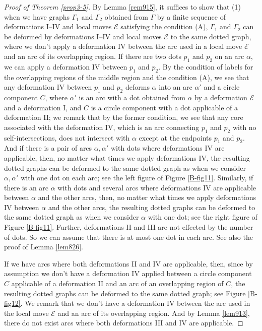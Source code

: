 \documentclass[a4paper,11pt]{amsart}
\numberwithin{equation}{section}
\begin{document}
 
\begin{proof}[
Proof of Theorem \ref{prop3-5}]
By Lemma \ref{rem915}, 
it suffices to show that 
(1) when we have graphs $\Gamma_1$ and $\Gamma_2$ obtained from  $\Gamma$ by a finite sequence of deformations I--IV and local moves $\mathcal{E}$ satisfying the condition (A), $\Gamma_1$ and $\Gamma_2$ can be deformed by deformations I--IV and local moves $\mathcal{E}$ to the same dotted graph, where we don't apply a deformation IV between the arc used in a local move $\mathcal{E}$ and an arc of its overlapping region.  
If there are two dots $p_1$ and $p_2$ on an arc $\alpha$, we can apply a deformation IV between $p_1$ and $p_2$. By the condition of labels for the overlapping regions of the middle region and the condition (A), we see that any deformation IV between $p_1$ and $p_2$ deforms $\alpha$ into an arc $\alpha'$ and a circle component $C$, where $\alpha'$ is an arc with a dot obtained from  $\alpha$ by a deformation $\mathcal{E}$ and a deformation I, and $C$ is a circle component with a dot applicable of a deformation II; we remark that by the former condition, we see that any core associated with the deformation IV, which is an arc connecting $p_1$ and $p_2$ with no self-intersections, does not intersect with $\alpha$ except at the endpoints $p_1$ and $p_2$. 
And if there is a pair of arcs $\alpha, \alpha'$ with dots where deformations IV are applicable, 
then, no matter what times we apply deformations IV, the resulting dotted graphs can be deformed to the same dotted graph as when we consider $\alpha, \alpha'$ with one dot on each arc; see the left figure of Figure \ref{B-fig11}. 
Similarly, if there is an arc $\alpha$ with dots and several arcs where deformations IV are applicable between $\alpha$ and the other arcs, 
then, no matter what times we apply deformations IV between $\alpha$ and the other arcs, the resulting dotted graphs can be deformed to the same dotted graph as when we consider $\alpha$ with one dot; see the right figure of Figure \ref{B-fig11}. 
Further, deformations II and III are not effected by the number of dots. 
So we can assume that there is at most one dot in each arc. See also the proof of Lemma \ref{lem826}. 
 
If we have arcs where both deformations II and IV are applicable, then, since by assumption we don't have a deformation IV applied between a circle component $C$ applicable of a deformation II and an arc of an overlapping region of $C$, the resulting dotted graphs can be deformed to the same dotted graph; see Figure \ref{B-fig12}. We remark that we don't have a deformation IV between the arc used in the local move $\mathcal{E}$ and an arc of its overlapping region. 
And by Lemma \ref{lem913}, there do not exist arcs where both deformations III and IV are applicable. 


\end{proof}
\end{document}
